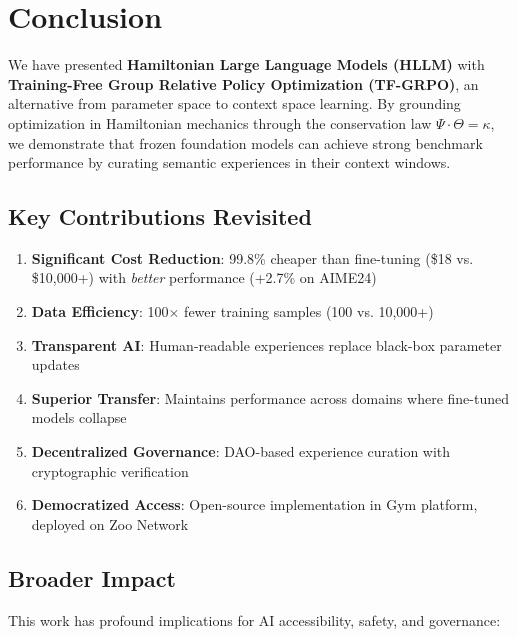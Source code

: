 \section{Conclusion}


We have presented \textbf{Hamiltonian Large Language Models (HLLM)} with \textbf{Training-Free Group Relative Policy Optimization (TF-GRPO)}, an alternative from parameter space to context space learning. By grounding optimization in Hamiltonian mechanics through the conservation law $\Psi \cdot \Theta = \kappa$, we demonstrate that frozen foundation models can achieve strong benchmark performance by curating semantic experiences in their context windows.

\subsection{Key Contributions Revisited}

\begin{enumerate}
    \item \textbf{Significant Cost Reduction}: 99.8\% cheaper than fine-tuning (\$18 vs. \$10,000+) with \textit{better} performance (+2.7\% on AIME24)

    \item \textbf{Data Efficiency}: 100× fewer training samples (100 vs. 10,000+)

    \item \textbf{Transparent AI}: Human-readable experiences replace black-box parameter updates

    \item \textbf{Superior Transfer}: Maintains performance across domains where fine-tuned models collapse

    \item \textbf{Decentralized Governance}: DAO-based experience curation with cryptographic verification

    \item \textbf{Democratized Access}: Open-source implementation in Gym platform, deployed on Zoo Network
\end{enumerate}

\subsection{Broader Impact}

This work has profound implications for AI accessibility, safety, and governance:

